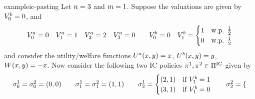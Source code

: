 \begin{restatable}{example}{ic-pasting}
    Let $n=3$ and $m=1$. Suppose the valuations are given by
    \(
        V^b_{0}=0
    \),
    and
    \begin{gather*}
        V^a_{0}=0
        \quad
        V^a_{1}=1
        \quad
        V^a_{2}=2
        \quad
        V^a_{3}
        =
        0
        \qquad
        V^b_{0}=0
        \quad
        V^b_{1}=
        \begin{cases}
            1
            & 
            \text{w.p. } \frac{1}{2}
            \\
            0
            & 
            \text{w.p. } \frac{1}{2}
        \end{cases}
    \end{gather*}
    and consider the utility/welfare functions 
    \(
        U^a(x,y)=x
    \),
    \(
        U^b(x,y)=y
    \),
    \(
        W(x,y)
        =
        -x
    \).
    Now consider the following two IC policies 
    \(
        \pi^1, \pi^2\in\Pi^{\text{IC}}
    \)
    given by
    \begin{align*}
        \sigma_{0}^1 
        = 
        \sigma_{0}^2 
        =
        (0,0)
        \qquad
        \sigma_{1}^1
        =
        \sigma_{1}^2
        = (1,1)
        \qquad
        \sigma_{2}^1 
        =
        \begin{cases}
            (2,1)
            &
            \text{if } V^b_{1}=1
            \\
            (3,1)
            &
            \text{if } V^b_{1}=0
        \end{cases}  
        \qquad
        \sigma_{2}^2
        =
        \begin{cases}

\end{cases}
\end{align*}
\end{restatable}
